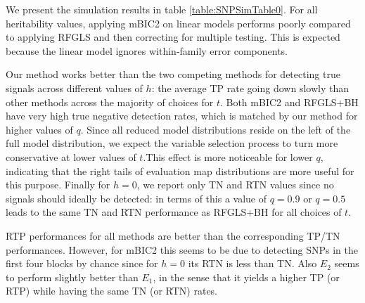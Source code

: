We present the simulation results in table \ref{table:SNPSimTable0}. For all heritability values, applying mBIC2 on linear models performs poorly compared to applying RFGLS and then correcting for multiple testing. This is expected because the linear model ignores within-family error components.

Our method works better than the two competing methods for detecting true signals across different values of $h$: the average TP rate going down slowly than other methods across the majority of choices for $t$. Both mBIC2 and RFGLS+BH have very high true negative detection rates, which is matched by our method for higher values of $q$. Since all reduced model distributions reside on the left of the full model distribution, we expect the variable selection process to turn more conservative at lower values of $t$.This effect is more noticeable for lower $q$, indicating that the right tails of evaluation map distributions are more useful for this purpose. Finally for $h=0$, we report only TN and RTN values since no signals should ideally be detected: in terms of this a value of $q=0.9$ or $q=0.5$ leads to the same TN and RTN performance as RFGLS+BH for all choices of $t$.

RTP performances for all methods are better than the corresponding TP/TN performances. However, for mBIC2 this seems to be due to detecting SNPs in the first four blocks by chance since for $h=0$ its RTN is less than TN. Also $E_2$ seems to perform slightly better than $E_1$, in the sense that it yields a higher TP (or RTP) while having the same TN (or RTN) rates.

